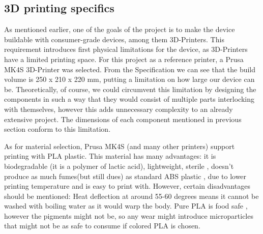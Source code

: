 \subsection{3D printing specifics}
As mentioned earlier, one of the goals of the project is to make the device buildable with consumer-grade devices, among them 3D-Printers. This requirement introduces first physical limitations for the device, as 3D-Printers have a limited printing space. For this project as a reference printer, a Prusa MK4S 3D-Printer \cite{PrusaMK4Specs} was selected. From the Specification we can see that the build volume is 250 x 210 x 220 mm, putting a limitation on how large our device can be. Theoretically, of course, we could circumvent this limitation by designing the components in such a way that they would consist of multiple parts interlocking with themselves, however this adds unnecessary complexity to an already extensive project. The dimensions of each component mentioned in previous section conform to this limitation.

As for material selection, Prusa MK4S (and many other printers) support printing with \ac{PLA} plastic. This material has many advantages: it is biodegradable (it is a polymer of lactic acid), lightweight, sterile \cite{raj2018case}, doesn't produce as much fumes(but still dues) as standard \ac{ABS} plastic \cite{manoj2021review}, due to lower printing temperature and is easy to print with. However, certain disadvantages should be mentioned: Heat deflection at around 55-60 degrees \cite{tabi2019effect} means it cannot be washed with boiling water as it would warp the body. Pure \ac{PLA} is food safe \cite{conn1995safety}, however the pigments might not be, so any wear might introduce microparticles that might not be as safe to consume if colored \ac{PLA} is chosen.

